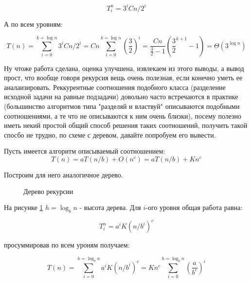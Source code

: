 \begin{equation}
	T_i^n = 3^iCn/2^i
\end{equation}

А по всем уровням:

\begin{equation}
	T(n) = \sum_{i=0}^{k=\log n} 3^iCn/2^i = Cn \sum_{i=0}^{k=\log n} \left(\frac{3}{2}\right)^i = \frac{Cn}{\frac{3}{2}-1}\left({\frac{3}{2}}^{k+1}-1\right) = \Theta (3^{\log n})
\end{equation}

Ну чтоже работа сделана, оценка улучшена, извлекаем из этого выводы, а вывод прост, что вообще говоря рекурсия вещь очень полезная, если конечно уметь ее аналаизировать. Реккурентные соотношения подобного класса (разделение исходной задачи на равные подзадачи) довольно часто встречаются в практике (большинство алгоритмов типа "разделяй и властвуй" описываются подобными соотношениями, а те что не описываются к ним очень близки), посему полезно иметь некий простой общий способ решения таких соотношений, получить такой спосбо не трудно, по схеме с деревом, давайте попробуем его вывести.

Пусть имеется алгоритм описываемый соотношением:
\begin{equation}
	T(n) = aT(n/b) + O(n^c) = aT(n/b) + Kn^c
\end{equation}

Построим для него аналогичное дерево.
\begin{figure}[h]
	\noindent{}
	\caption{Дерево рекурсии}
	\label{pic::com_tree}
\end{figure}
На рисунке \ref{pic::com_tree} $h = \log_b n$ - высота дерева. Для $i$-ого уровня общая работа равна:

\begin{equation}
	T_i^n = {a^i}K\left({n}/{b^i}\right)^c
\end{equation}

просуммировав по всем уроням получаем:

\begin{equation}
	T(n) = \sum_{i=0}^{h=\log_b n} {a^i}K\left({n}/{b^i}\right)^c = K n^c \sum_{i=0}^{h=\log_b n} \left(\frac{a}{b^c}\right)^i
\end{equation}

